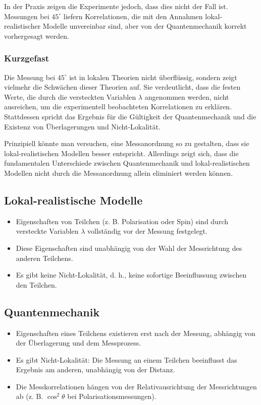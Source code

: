 \documentclass[12pt,a4paper]{article}
\begin{document}
	In der Praxis zeigen die Experimente jedoch, dass dies nicht der Fall ist. Messungen bei $45^\circ$ liefern Korrelationen, die mit den Annahmen lokal-realistischer Modelle unvereinbar sind, aber von der Quantenmechanik korrekt vorhergesagt werden.
	
	\subsubsection{Kurzgefast}
	Die Messung bei $45^\circ$ ist in lokalen Theorien nicht überflüssig, sondern zeigt vielmehr die Schwächen dieser Theorien auf. Sie verdeutlicht, dass die festen Werte, die durch die versteckten Variablen $\lambda$ angenommen werden, nicht ausreichen, um die experimentell beobachteten Korrelationen zu erklären. Stattdessen spricht das Ergebnis für die Gültigkeit der Quantenmechanik und die Existenz von Überlagerungen und Nicht-Lokalität.
	
	Prinzipiell könnte man versuchen, eine Messanordnung so zu gestalten, dass sie lokal-realistischen Modellen besser entspricht. Allerdings zeigt sich, dass die fundamentalen Unterschiede zwischen Quantenmechanik und lokal-realistischen Modellen nicht durch die Messanordnung allein eliminiert werden können.
	
	
	
	
	
	\subsection{Lokal-realistische Modelle}
	\begin{itemize}
		\item Eigenschaften von Teilchen (z. B. Polarisation oder Spin) sind durch versteckte Variablen $\lambda$ vollständig vor der Messung festgelegt.
		\item Diese Eigenschaften sind unabhängig von der Wahl der Messrichtung des anderen Teilchens.
		\item Es gibt keine Nicht-Lokalität, d. h., keine sofortige Beeinflussung zwischen den Teilchen.
	\end{itemize}
	
	\subsection{Quantenmechanik}
	\begin{itemize}
		\item Eigenschaften eines Teilchens existieren erst nach der Messung, abhängig von der Überlagerung und dem Messprozess.
		\item Es gibt Nicht-Lokalität: Die Messung an einem Teilchen beeinflusst das Ergebnis am anderen, unabhängig von der Distanz.
		\item Die Messkorrelationen hängen von der Relativausrichtung der Messrichtungen ab (z. B. $\cos^2 \theta$ bei Polarisationsmessungen).
	\end{itemize}
	
\end{document}

